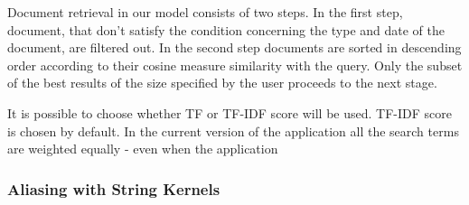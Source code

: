 Document retrieval in our model consists of two steps. In the first step, document, that don't satisfy the condition concerning the type and date of the document, are filtered out. In the second step documents are sorted in descending order according to their cosine measure similarity with the query. Only the subset of the best results of the size specified by the user proceeds to the next stage.

It is possible to choose whether TF or TF-IDF score will be used. TF-IDF score is chosen by default.  In the current version of the application all the search terms are weighted equally - even when the application

\subsubsection {Aliasing with String Kernels}
\label{sec:aliasing_string_kernel}

